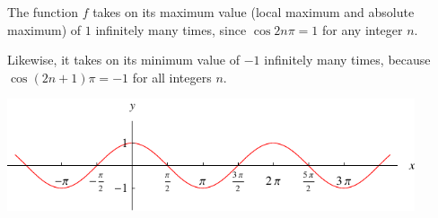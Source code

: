 \begin{frame}
\begin{example}[Example 1, p. 263]
The function $f$ takes on its maximum value (local maximum and absolute maximum) of $1$ infinitely many times, since $\cos 2n \pi = 1$ for any integer $n$.

Likewise, it takes on its minimum value of $-1$ infinitely many times, because $\cos (2n+1)\pi = -1$ for all integers $n$.

\includegraphics[width=12cm]{maxima-minima/pictures/app-d-cos.pdf}%
\end{example}
\end{frame}
